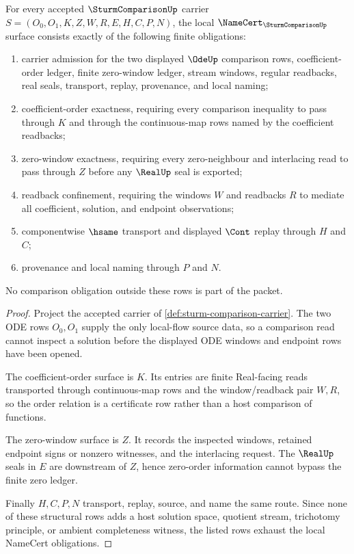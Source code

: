 \begin{theorem}\label{thm:sturm-comparison-namecert-obligations}
For every accepted $\SturmComparisonUp$ carrier $S=(O_0,O_1,K,Z,W,R,E,H,C,P,N)$, the local $\NameCert_{\SturmComparisonUp}$ surface consists exactly of the following finite obligations:
\begin{enumerate}
\item carrier admission for the two displayed $\OdeUp$ comparison rows, coefficient-order ledger, finite zero-window ledger, stream windows, regular readbacks, real seals, transport, replay, provenance, and local naming;
\item coefficient-order exactness, requiring every comparison inequality to pass through $K$ and through the continuous-map rows named by the coefficient readbacks;
\item zero-window exactness, requiring every zero-neighbour and interlacing read to pass through $Z$ before any $\RealUp$ seal is exported;
\item readback confinement, requiring the windows $W$ and readbacks $R$ to mediate all coefficient, solution, and endpoint observations;
\item componentwise $\hsame$ transport and displayed $\Cont$ replay through $H$ and $C$;
\item provenance and local naming through $P$ and $N$.
\end{enumerate}
No comparison obligation outside these rows is part of the packet.
\end{theorem}
\begin{proof}
Project the accepted carrier of \autoref{def:sturm-comparison-carrier}. The two ODE rows $O_0,O_1$ supply the only local-flow source data, so a comparison read cannot inspect a solution before the displayed ODE windows and endpoint rows have been opened.

The coefficient-order surface is $K$. Its entries are finite Real-facing reads transported through continuous-map rows and the window/readback pair $W,R$, so the order relation is a certificate row rather than a host comparison of functions.

The zero-window surface is $Z$. It records the inspected windows, retained endpoint signs or nonzero witnesses, and the interlacing request. The $\RealUp$ seals in $E$ are downstream of $Z$, hence zero-order information cannot bypass the finite zero ledger.

Finally $H,C,P,N$ transport, replay, source, and name the same route. Since none of these structural rows adds a host solution space, quotient stream, trichotomy principle, or ambient completeness witness, the listed rows exhaust the local NameCert obligations.
\end{proof}

